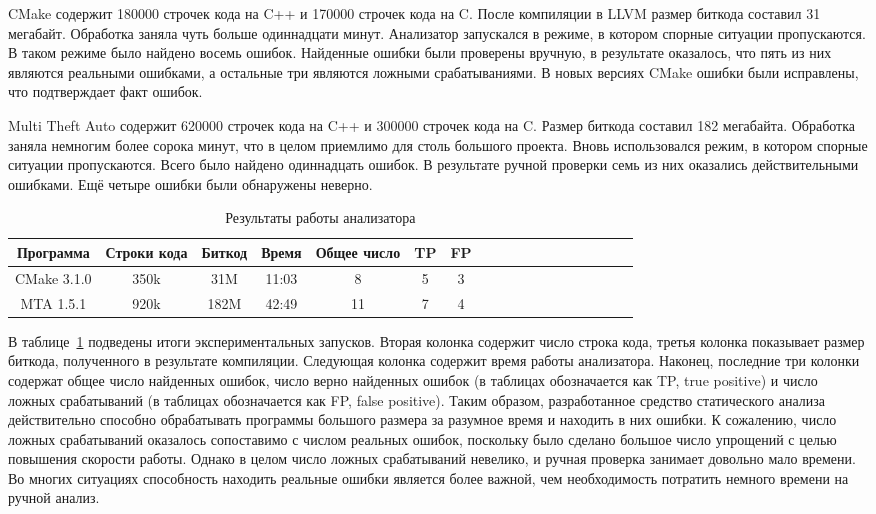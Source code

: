 CMake содержит 180000 строчек кода на C++ и 170000 строчек кода на
C. После компиляции в LLVM размер биткода составил 31
мегабайт. Обработка заняла чуть больше одиннадцати минут. Анализатор
запускался в режиме, в котором спорные ситуации пропускаются. В таком
режиме было найдено восемь ошибок. Найденные ошибки были проверены
вручную, в результате оказалось, что пять из них являются реальными
ошибками, а остальные три являются ложными срабатываниями. В новых
версиях CMake ошибки были исправлены, что подтверждает факт ошибок.

Multi Theft Auto содержит 620000 строчек кода на C++ и 300000 строчек
кода на C. Размер биткода составил 182 мегабайта. Обработка заняла
немногим более сорока минут, что в целом приемлимо для столь большого
проекта. Вновь использовался режим, в котором спорные ситуации
пропускаются. Всего было найдено одиннадцать ошибок. В результате
ручной проверки семь из них оказались действительными ошибками. Ещё
четыре ошибки были обнаружены неверно.

\begin{table}[!h]
\caption{Результаты работы анализатора}\label{tab:analyzer-results}
\centering
  \begin{tabular}{|*{18}{c|}}\hline
  Программа   & Строки кода & Биткод & Время & Общее число & TP & FP \\\hline
  CMake 3.1.0 & 350k        & 31M    & 11:03 & 8           & 5  & 3  \\\hline
  MTA 1.5.1   & 920k        & 182M   & 42:49 & 11          & 7  & 4  \\\hline
  \end{tabular}
\end{table}

В таблице~\ref{tab:analyzer-results} подведены итоги экспериментальных
запусков. Вторая колонка содержит число строка кода, третья колонка
показывает размер биткода, полученного в результате
компиляции. Следующая колонка содержит время работы
анализатора. Наконец, последние три колонки содержат общее число
найденных ошибок, число верно найденных ошибок (в таблицах
обозначается как TP, true positive) и число ложных срабатываний (в
таблицах обозначается как FP, false positive). Таким образом,
разработанное средство статического анализа действительно способно
обрабатывать программы большого размера за разумное время и находить в
них ошибки. К сожалению, число ложных срабатываний оказалось
сопоставимо с числом реальных ошибок, поскольку было сделано большое
число упрощений с целью повышения скорости работы. Однако в целом
число ложных срабатываний невелико, и ручная проверка занимает
довольно мало времени. Во многих ситуациях способность находить
реальные ошибки является более важной, чем необходимость потратить
немного времени на ручной анализ.

